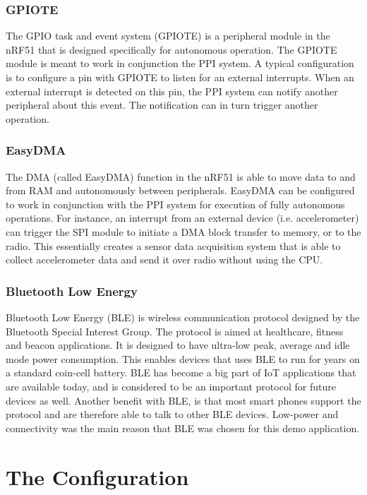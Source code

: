 \subsubsection{GPIOTE}

The GPIO task and event system (GPIOTE) is a peripheral module in the nRF51 that is designed specifically for autonomous operation. The GPIOTE module is meant to work in conjunction the PPI system. A typical configuration is to configure a pin with GPIOTE to listen for an external interrupts. When an external interrupt is detected on this pin, the PPI system can notify another peripheral about this event. The notification can in turn trigger another operation.

\subsubsection{EasyDMA}

The DMA (called EasyDMA) function in the nRF51 is able to move data to and from RAM and autonomously between peripherals. EasyDMA can be configured to work in conjunction with the PPI system for execution of fully autonomous operations. For instance, an interrupt from an external device (i.e. accelerometer) can trigger the SPI module to initiate a DMA block transfer to memory, or to the radio. This essentially creates a sensor data acquisition system that is able to collect accelerometer data and send it over radio without using the CPU.

\subsubsection{Bluetooth Low Energy}

Bluetooth Low Energy (BLE) is wireless communication protocol designed by the Bluetooth Special Interest Group. The protocol is aimed at healthcare, fitness and beacon applications. It is designed to have ultra-low peak, average and idle mode power consumption. This enables devices that uses BLE to run for years on a standard coin-cell battery. BLE has become a big part of IoT applications that are available today, and is considered to be an important protocol for future devices as well. Another benefit with BLE, is that most smart phones support the protocol and are therefore able to talk to other BLE devices. Low-power and connectivity was the main reason that BLE was chosen for this demo application. 

\section{The Configuration}

